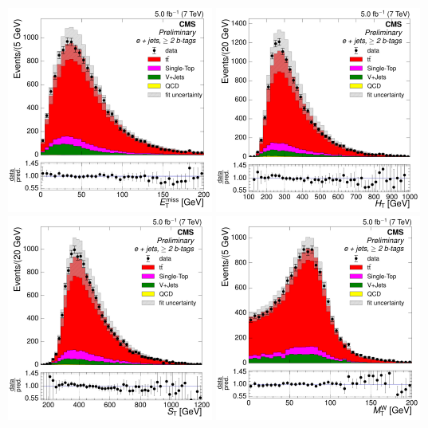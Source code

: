 \begin{figure}[hbtp]
    \centering
     \includegraphics[width=0.48\textwidth]{Chapters/04_Analysis/04b_XSections/images/control_plots/after_fit/7TeV/EPlusJets_patType1CorrectedPFMet_2orMoreBtags_with_ratio.pdf}\hfill
     \includegraphics[width=0.48\textwidth]{Chapters/04_Analysis/04b_XSections/images/control_plots/after_fit/7TeV/EPlusJets_HT_2orMoreBtags_with_ratio.pdf}\\
     \includegraphics[width=0.48\textwidth]{Chapters/04_Analysis/04b_XSections/images/control_plots/after_fit/7TeV/EPlusJets_patType1CorrectedPFMet_ST_2orMoreBtags_with_ratio.pdf}\hfill
     \includegraphics[width=0.48\textwidth]{Chapters/04_Analysis/04b_XSections/images/control_plots/after_fit/7TeV/EPlusJets_patType1CorrectedPFMet_MT_2orMoreBtags_with_ratio.pdf}\\

\end{figure}
